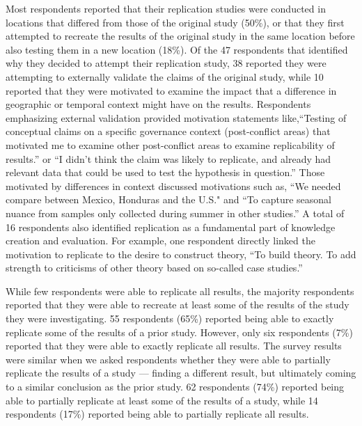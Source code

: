 \documentclass[]{interact}
\theoremstyle{plain}%
\theoremstyle{definition}
\theoremstyle{remark}
\begin{document}
Most respondents reported that their replication studies were conducted in locations that differed from those of the original study (50\%), or that they first attempted to recreate the results of the original study in the same location before also testing them in a new location (18\%). 
Of the 47 respondents that identified why they decided to attempt their replication study, 38 reported they were attempting to externally validate the claims of the original study, while 10 reported that they were motivated to examine the impact that a difference in geographic or temporal context might have on the results. 
Respondents emphasizing external validation provided motivation statements like,``Testing of conceptual claims on a specific governance context (post-conflict areas) that motivated me to examine other post-conflict areas to examine replicability of results.'' or ``I didn't think the claim was likely to replicate, and already had relevant data that could be used to test the hypothesis in question.''
Those motivated by differences in context discussed motivations such as, ``We needed compare between Mexico, Honduras and the U.S." and ``To capture seasonal nuance from samples only collected during summer in other studies.''
A total of 16 respondents also identified replication as a fundamental part of knowledge creation and evaluation. 
For example, one respondent directly linked the motivation to replicate to the desire to construct theory, ``To build theory. To add strength to criticisms of other theory based on so-called case studies.''

While few respondents were able to replicate all results, the majority respondents reported that they were able to recreate at least some of the results of the study they were investigating. 
55 respondents (65\%) reported being able to exactly replicate some of the results of a prior study. 
However, only six respondents (7\%) reported that they were able to exactly replicate all results.
The survey results were similar when we asked respondents whether they were able to partially replicate the results of a study --- finding a different result, but ultimately coming to a similar conclusion as the prior study. 
62 respondents (74\%) reported being able to partially replicate at least some of the results of a study, while 14 respondents (17\%) reported being able to partially replicate all results. 
\end{document}
